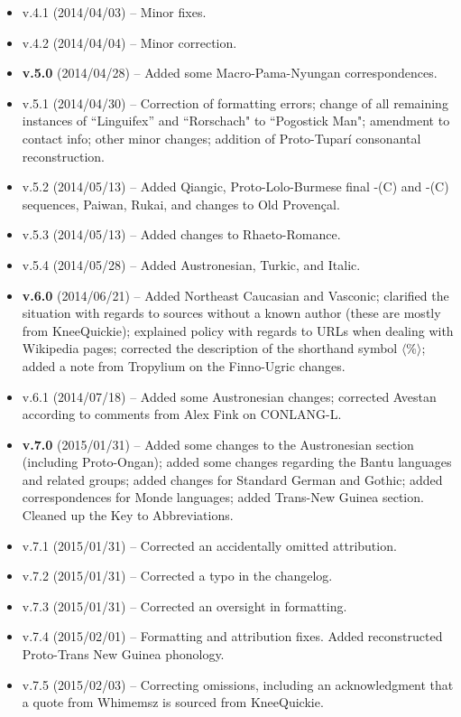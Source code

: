 \documentclass[11pt]{article}
\newcommand{\ipa}{\textipa}
\begin{document}
\begin{itemize}
\item v.4.1 (2014/04/03) -- Minor fixes.
\item v.4.2 (2014/04/04) -- Minor correction.
\item \textbf{v.5.0} (2014/04/28) -- Added some Macro-Pama-Nyungan correspondences.
\item v.5.1 (2014/04/30) -- Correction of formatting errors; change of all remaining instances of ``Linguifex'' and ``Rorschach" to ``Pogostick Man"; amendment to contact info; other minor changes; addition of Proto-Tupar\'{i} consonantal reconstruction.
\item v.5.2 (2014/05/13) -- Added Qiangic, Proto-Lolo-Burmese final -\ipa{i}(C) and -\ipa{u}(C) sequences, Paiwan, Rukai, and changes to Old Proven\c{c}al.
\item v.5.3 (2014/05/13) -- Added changes to Rhaeto-Romance.
\item v.5.4 (2014/05/28) -- Added Austronesian, Turkic, and Italic.
\item {\bf v.6.0} (2014/06/21) -- Added Northeast Caucasian and Vasconic; clarified the situation with regards to sources without a known author (these are mostly from KneeQuickie); explained policy with regards to URLs when dealing with Wikipedia pages; corrected the description of the shorthand symbol $\langle$\%$\rangle$; added a note from Tropylium on the Finno-Ugric changes.
\item v.6.1 (2014/07/18) -- Added some Austronesian changes; corrected Avestan according to comments from Alex Fink on CONLANG-L.
\item \textbf{v.7.0} (2015/01/31) -- Added some changes to the Austronesian section (including Proto-Ongan); added some changes regarding the Bantu languages and related groups; added changes for Standard German and Gothic; added correspondences for Monde languages; added Trans-New Guinea section. Cleaned up the Key to Abbreviations.
\item v.7.1 (2015/01/31) -- Corrected an accidentally omitted attribution.
\item v.7.2 (2015/01/31) -- Corrected a typo in the changelog.
\item v.7.3 (2015/01/31) -- Corrected an oversight in formatting.
\item v.7.4 (2015/02/01) -- Formatting and attribution fixes. Added reconstructed Proto-Trans New Guinea phonology.
\item v.7.5 (2015/02/03) -- Correcting omissions, including an acknowledgment that a quote from Whimemsz is sourced from KneeQuickie.

\end{itemize}
\end{document}
